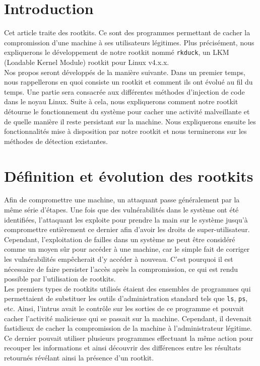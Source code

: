 \documentclass[12pt]{article}
\begin{document}
\newcommand*{\escape}[1]{\texttt{\textbackslash#1}}
\newcommand*{\escapeI}[1]{\texttt{\expandafter\string\csname #1\endcsname}}
\newcommand*{\escapeII}[1]{\texttt{\char`\\#1}}


\section*{Introduction}

    Cet article traite des rootkits. Ce sont des programmes permettant de cacher la compromission d'une machine à ses utilisateurs légitimes. Plus précisément, nous expliquerons le développement de notre rootkit nommé \texttt{rkduck}, un LKM (Loadable Kernel Module) rootkit pour Linux v4.x.x. \\

    Nos propos seront développés de la manière suivante. Dans un premier temps, nous rappellerons en quoi consiste un rootkit et comment ils ont évolué au fil du temps. Une partie sera consacrée aux différentes méthodes d'injection de code dans le noyau Linux. Suite à cela, nous expliquerons comment notre rootkit détourne le fonctionnement du système pour cacher une activité malveillante et de quelle manière il reste persistant sur la machine. Nous expliquerons ensuite les fonctionnalités mise à disposition par notre rootkit et nous terminerons sur les méthodes de détection existantes.

\section{Définition et évolution des rootkits}

    Afin de compromettre une machine, un attaquant passe généralement par la même série d'étapes. Une fois que des vulnérabilités dans le système ont été identifiées, l'attaquant les exploite pour prendre la main sur le système jusqu'à compromettre entièrement ce dernier afin d'avoir les droits de super-utilisateur.
    Cependant, l'exploitation de failles dans un système ne peut être considéré comme un moyen sûr pour accéder à une machine, car le simple fait de corriger les vulnérabilités empêcherait d'y accéder à nouveau. C'est pourquoi il est nécessaire de faire persister l'accès après la compromission, ce qui est rendu possible par l'utilisation de rootkits.\\
    
    Les premiers types de rootkits utilisés étaient des ensembles de programmes qui permettaient de substituer les outils d'administration standard tels que \texttt{ls}, \texttt{ps}, etc. Ainsi, l'intrus avait le contrôle sur les sorties de ce programme et pouvait cacher l'activité malicieuse qui se passait sur la machine. Cependant, il devenait fastidieux de cacher la compromission de la machine à l'administrateur légitime. Ce dernier pouvait utiliser plusieurs programmes effectuant la même action pour recouper les informations et ainsi découvrir des différences entre les résultats retournés révélant ainsi la présence d'un rootkit.\\
    
\end{document}
